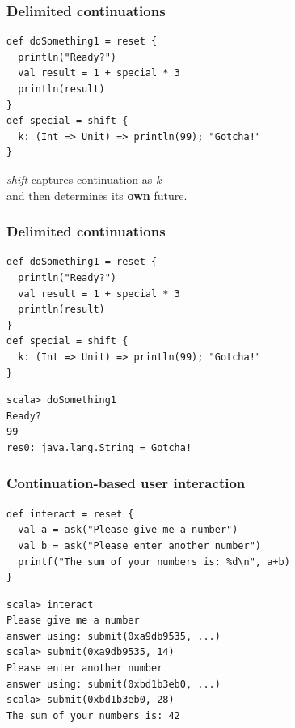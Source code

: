 \documentclass[14pt,t,usepdftitle=false,
xcolornames=x11names,svgnames,dvipsnames]{beamer}
\begin{document}
\begin{frame}[fragile]
  \frametitle{Delimited continuations}
\begin{lstlisting}[style=scala,emph={[2]reset,shift}]
def doSomething1 = reset {
  println("Ready?")
  val result = 1 + special * 3
  println(result)
}
def special = shift {
  k: (Int => Unit) => println(99); "Gotcha!"
}
\end{lstlisting}
  \textit{shift} captures continuation as \textit{k}\\and then determines its
  \textbf{own} future.
\end{frame}

\begin{frame}[fragile]
  \frametitle{Delimited continuations}
\begin{lstlisting}[style=scala,emph={[2]reset,shift}]
def doSomething1 = reset {
  println("Ready?")
  val result = 1 + special * 3
  println(result)
}
def special = shift {
  k: (Int => Unit) => println(99); "Gotcha!"
}
\end{lstlisting}
\begin{lstlisting}[style=scalarepl]
scala> doSomething1
Ready?
99
res0: java.lang.String = Gotcha!
\end{lstlisting}
\end{frame}

\begin{frame}[fragile]
  \frametitle{Continuation-based user interaction}
\begin{lstlisting}[style=scala,emph={[2]reset,shift}]
def interact = reset {
  val a = ask("Please give me a number")
  val b = ask("Please enter another number")
  printf("The sum of your numbers is: %d\n", a+b)
}
\end{lstlisting}
\begin{lstlisting}[style=scalarepl]
scala> interact
Please give me a number
answer using: submit(0xa9db9535, ...)
scala> submit(0xa9db9535, 14)
Please enter another number
answer using: submit(0xbd1b3eb0, ...)
scala> submit(0xbd1b3eb0, 28)
The sum of your numbers is: 42
\end{lstlisting}
\end{frame}
\end{document}
